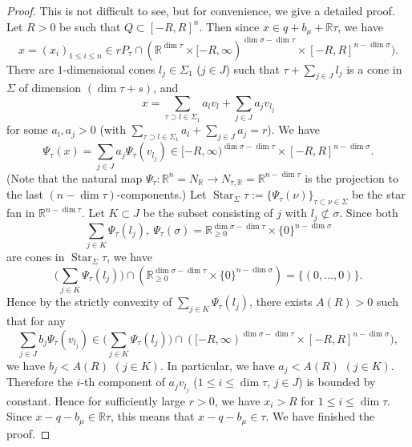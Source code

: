 \documentclass[12pt,a4]{amsart}
\def\R{\mathbb{R}}
\def\Star{\mathop{\mathrm{Star}}\nolimits}
\numberwithin{equation}{section}
\numberwithin{figure}{section}
\begin{document}
\begin{proof}
     This is not difficult to see, 
     but for convenience, we give a detailed proof.
      Let $R>0$ be such that $Q \subset [-R,R]^n$.
      Then since $x \in q+b_\mu + \R \tau$, we have 
      $$x =(x_i)_{1 \leq i \leq n} \in rP_{\tau} \cap ( \R^{\dim \tau } \times [-R,\infty)^{\dim \sigma - \dim \tau} \times [-R,R]^{n -\dim \sigma}).$$
      There are $1$-dimensional cones $l_j \in \Sigma_1$ ($j \in J$) 
         such that 
         $\tau + \sum_{ j \in J } l_j  $ 
         is a cone in $\Sigma$ of dimension $(\dim \tau +s)$,
         and 
      $$x = \sum_{ \tau \supset l \in \Sigma_1 } 
        a_l v_l + \sum_{ j \in J } a_j v_{l_j}$$
        for some $a_l, a_j >0 $ 
        (with 
      $ \sum_{ \tau \supset l \in \Sigma_1 } 
        a_l  + \sum_{ j \in J } a_j =r$).
     We have   
      $$\Psi_{\tau} (x) = \sum_{  j \in J } a_j \Psi_{\tau} (v_{l_j}) \in 
      [-R,\infty)^{\dim \sigma - \dim \tau} \times [-R,R]^{n -\dim \sigma}.$$
     (Note that the natural map 
     $\Psi_{\tau} \colon \R^n = N_\R \to N_{\tau,\R} = \R^{n-\dim \tau }$ is 
     the projection to the last $(n-\dim \tau)$-components.)
      Let $\Star_{\Sigma} \tau 
           := \{ \Psi_{\tau} (\nu)  \}_{\tau \subset \nu \in \Sigma }$ 
            be the star fan in $\R^{n-\dim \tau}$.
      Let $K \subset J$ be the subset consisting of  $j $ with $l_j \not\subset \sigma$.
      Since both
      $$ \sum_{j \in K} 
      \Psi_{\tau}(l_j), 
      \ 
      \Psi_\tau (\sigma) = 
      \R_{\geq 0}^{\dim \sigma - \dim \tau} \times \{0\}^{n -\dim \sigma} $$
      are 
      cones in $ \Star_{\Sigma} \tau$, 
      we have 
      $$\bigg( \sum_{j \in K} 
      \Psi_{\tau}(l_j)  \bigg)
       \cap 
      (\R_{\geq 0}^{\dim \sigma - \dim \tau} \times \{0\}^{n -\dim \sigma} ) 
       = \{ (0, \dots,0) \}. $$
      Hence
      by
      the strictly convexity of $\sum_{ j \in K } 
      \Psi_{\tau}(l_j) $, 
      there exists $A(R)>0$ 
      such that for any 
      $$ \sum_{  j \in J } b_j \Psi_{\tau} (v_{l_j})
       \in 
       \bigg(\sum_{j \in K} 
      \Psi_{\tau}(l_j)  \bigg)
      \cap 
      ([-R,\infty)^{\dim \sigma - \dim \tau} \times [-R,R]^{n -\dim \sigma}),  $$
      we have 
     $b_j < A(R)$ $(j \in K)$.
     In particular, we have 
     $a_j < A(R)$ $(j \in K)$.
       Therefore  
      the $i$-th component of $a_j v_{l_j}$ 
     ($1 \leq i \leq \dim \tau$, $j \in J$)
      is bounded by constant. 
      Hence for sufficiently large $r>0$, 
      we have $x_i >R$ for $1 \leq i \leq \dim \tau$.
      Since 
      $x - q-b_\mu \in \R \tau$, 
      this means that 
      $x - q- b_\mu \in \tau$.
      We have finished the proof.
   \end{proof}
\end{document}
